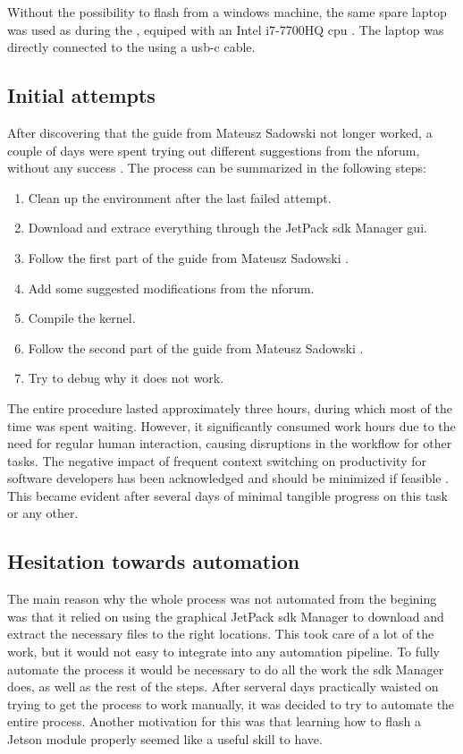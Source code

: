 Without the possibility to flash from a windows machine, the same spare laptop was used as during the \preproject, equiped with an Intel i7-7700HQ \gls{cpu} \cite{martensPortableSensorRig2022}.
The laptop was directly connected to the \jx using a usb-c cable.



\subsection{Initial attempts}
After discovering that the guide from Mateusz Sadowski not longer worked, a couple of days were spent trying out different suggestions from the \gls{nforum}, without any success \cite{martensPortableSensorRig2022}.
The process can be summarized in the following steps:
\begin{enumerate}
    \item Clean up the environment after the last failed attempt.
    \item Download and extrace everything through the JetPack \gls{sdk} Manager gui.
    \item Follow the first part of the guide from Mateusz Sadowski \cite{sadowskiEnablingPPSJetson2020}.
    \item Add some suggested modifications from the \gls{nforum}.
    \item Compile the kernel.
    \item Follow the second part of the guide from Mateusz Sadowski \cite{sadowskiEnablingPPSJetson2020}.
    \item Try to debug why it does not work.
\end{enumerate}
The entire procedure lasted approximately three hours, during which most of the time was spent waiting.
However, it significantly consumed work hours due to the need for regular human interaction, causing disruptions in the workflow for other tasks.
The negative impact of frequent context switching on productivity for software developers has been acknowledged and should be minimized if feasible \cite{meyerSoftwareDevelopersPerceptions2014}.
This became evident after several days of minimal tangible progress on this task or any other.

\subsection{Hesitation towards automation}
The main reason why the whole process was not automated from the begining was that it relied on using the graphical JetPack \gls{sdk} Manager to download and extract the necessary files to the right locations.
This took care of a lot of the work, but it would not easy to integrate into any automation pipeline.
To fully automate the process it would be necessary to do all the work the \gls{sdk} Manager does, as well as the rest of the steps.
After serveral days practically waisted on trying to get the process to work manually, it was decided to try to automate the entire process.
Another motivation for this was that learning how to flash a Jetson module properly seemed like a useful skill to have.

